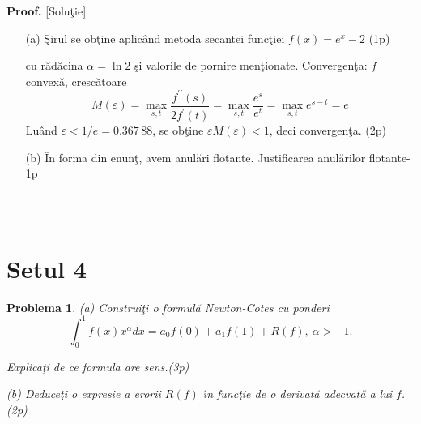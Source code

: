 \documentclass{article}%
\newtheorem{problem}[theorem]{Problema}
\newenvironment{proof}[1][Proof]{\noindent\textbf{#1.} }{\ \rule{0.5em}{0.5em}}
\begin{document}
\begin{proof}
[Solu\c{t}ie]

\begin{enumerate}
\item[(a)] \c{S}irul se ob\c{t}ine aplic\^{a}nd metoda secantei func\c{t}iei
$f(x)=e^{x}-2$ (1p)%
\begin{center}
\end{center}
cu r\u{a}d\u{a}cina $\alpha=\ln2$ \c{s}i valorile de pornire men\c{t}ionate.
Convergen\c{t}a: $f$ convex\u{a}, cresc\u{a}toare%
\[
M(\varepsilon)=\max_{s,t}\frac{f^{\prime\prime}(s)}{2f^{\prime}(t)}=\max
_{s,t}\frac{e^{s}}{e^{t}}=\max_{s,t}e^{s-t}=e
\]
Lu\^{a}nd $\varepsilon<1/e=\allowbreak0.367\,88$, se ob\c{t}ine $\varepsilon
M(\varepsilon)<1$, deci convergen\c{t}a. (2p)

\item[(b)] \^{I}n forma din enun\c{t}, avem anul\u{a}ri flotante. Justificarea
anul\u{a}rilor flotante-1p
\end{enumerate}
\end{proof}

\section*{Setul 4}

\begin{problem}
\label{pb4.16} (a) Construi\c{t}i o formul\u{a} Newton-Cotes cu ponderi
\[
\int_{0}^{1} f(x)x^{\alpha}dx=a_{0}f(0)+a_{1}f(1)+R(f),\ \alpha>-1.
\]


Explica\c{t}i de ce formula are sens.(3p)

(b) Deduce\c{t}i o expresie a erorii $R(f)$ \^{\i}n func\c{t}ie de o
derivat\u{a} adecvat\u{a} a lui $f$. (2p)
\end{problem}
\end{document}
